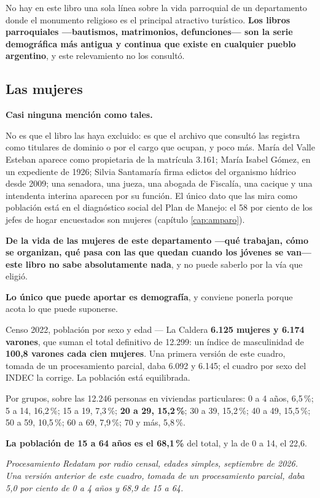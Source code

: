 No hay en este libro una sola línea sobre la vida parroquial de un departamento donde el
monumento religioso es el principal atractivo turístico. \textbf{Los libros parroquiales
---bautismos, matrimonios, defunciones--- son la serie demográfica más antigua y continua que
existe en cualquier pueblo argentino}, y este relevamiento no los consultó.

\subsection*{Las mujeres}

\textbf{Casi ninguna mención como tales.}

No es que el libro las haya excluido: es que el archivo que consultó las registra como
titulares de dominio o por el cargo que ocupan, y poco más. María del Valle Esteban aparece como propietaria de la matrícula 3.161; María Isabel Gómez, en un expediente de 1926; Silvia Santamaría firma edictos del organismo hídrico desde 2009; una senadora, una jueza, una abogada de Fiscalía, una cacique y una intendenta interina aparecen por su función. El único dato que las mira como población está en el diagnóstico social del Plan de Manejo: el 58 por ciento de los jefes de hogar encuestados son mujeres (capítulo \ref{cap:amparo}).

\textbf{De la vida de las mujeres de este departamento ---qué trabajan, cómo se organizan, qué
pasa con las que quedan cuando los jóvenes se van--- este libro no sabe absolutamente nada}, y
no puede saberlo por la vía que eligió.

\textbf{Lo único que puede aportar es demografía}, y conviene ponerla porque acota lo que puede
suponerse.

\begin{ficha}{Censo 2022, población por sexo y edad --- La Caldera}
\textbf{6.125 mujeres y 6.174 varones}, que suman el total definitivo de 12.299: un índice de masculinidad de \textbf{100,8 varones cada cien mujeres}. Una primera versión de este cuadro, tomada de un procesamiento parcial, daba 6.092 y 6.145; el cuadro por sexo del INDEC la corrige. La población está equilibrada.

Por grupos, sobre las 12.246 personas en viviendas particulares: 0 a 4 años, 6,5\,\%; 5 a 14, 16,2\,\%; 15 a 19, 7,3\,\%; \textbf{20 a 29, 15,2\,\%};
30 a 39, 15,2\,\%; 40 a 49, 15,5\,\%; 50 a 59, 10,5\,\%; 60 a 69, 7,9\,\%; 70 y más, 5,8\,\%.

\textbf{La población de 15 a 64 años es el 68,1\,\%} del total, y la de 0 a 14, el 22,6.

\textit{Procesamiento Redatam por radio censal, edades simples, septiembre de 2026. Una versión anterior de este cuadro, tomada de un procesamiento parcial, daba 5,0 por ciento de 0 a 4 años y 68,9 de 15 a 64.}
\end{ficha}

